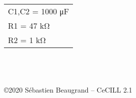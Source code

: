 \documentclass{kicad}
\begin{document}
\begin{center}
~\\
~\\
\\
~\\
~\\
\begin{tabular}{l}
C1,C2 = 1000 \si{\micro\farad}\\
R1 = 47 \si{\kilo\ohm}\\
R2 = 1 \si{\kilo\ohm}\\
\end{tabular}
\\
~\\
\\
\vfill
\scriptsize
\copyright 2020 Sébastien Beaugrand -- CeCILL 2.1
\end{center}
\end{document}
